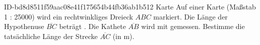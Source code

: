 \begin{exercise}
      {ID-bd8d8511f59aac08e41f175654b44fb36ab1b512}
      {Karte}
  \ifproblem\problem
    Auf einer Karte (Maßstab 1 : \num{25000}) wird ein rechtwinkliges Dreieck
    $ABC$ markiert. Die Länge der Hypothenuse $\overline{BC}$ beträgt .
    Die Kathete $\overline{AB}$ wird mit  gemessen. Bestimme die
    tatsächliche Länge der Strecke $\overline{AC}$ (in m).
  \fi
\end{exercise}
